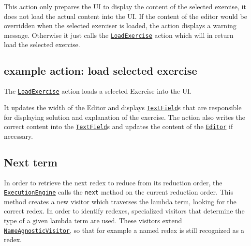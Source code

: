 This action only prepares the UI to display the content of the selected exercise, 
it does not load the actual content into the UI. If the content of the editor would 
be overridden when the selected exerciser is loaded, the action displays a warning
message. Otherwise it just calls the \texttt{\hyperref[type:edu.kit.wavelength.client.view.action.LoadExercise]{LoadExercise}} 
action which will in return load the selected exercise.

\subsection{example action: load selected exercise}
The \texttt{\hyperref[type:edu.kit.wavelength.client.view.action.LoadExercise]{LoadExercise}} 
action loads a selected Exercise into the UI.

It updates the width of the Editor and displays \texttt{\hyperref[type:edu.kit.wavelength.client.view.webui.component.TextField]{TextField}}s 
that are responsible for displaying solution and explanation of the exercise.
The action also writes the correct content into the \texttt{\hyperref[type:edu.kit.wavelength.client.view.webui.component.TextField]{TextField}}s and updates the content of the \texttt{\hyperref[type:edu.kit.wavelength.client.view.webui.component.Editor]{Editor}} if necessary.


\subsection{Next term}
\label{sec:nt}
In order to retrieve the next redex to reduce from its reduction order, the
\texttt{\hyperref[type:edu.kit.wavelength.client.model.ExecutionEngine]{ExecutionEngine}}
calls the \texttt{next} method on the current reduction order. This method creates a new visitor which traverses
the lambda term, looking for the correct redex. In order to identify redexes,
specialized visitors that determine the type of a given lambda term are used.
These visitors extend \texttt{\hyperref[type:edu.kit.wavelength.client.model.term.NameAgnosticVisitor]{NameAgnosticVisitor}},
so that for example a named redex is still recognized as a redex.



